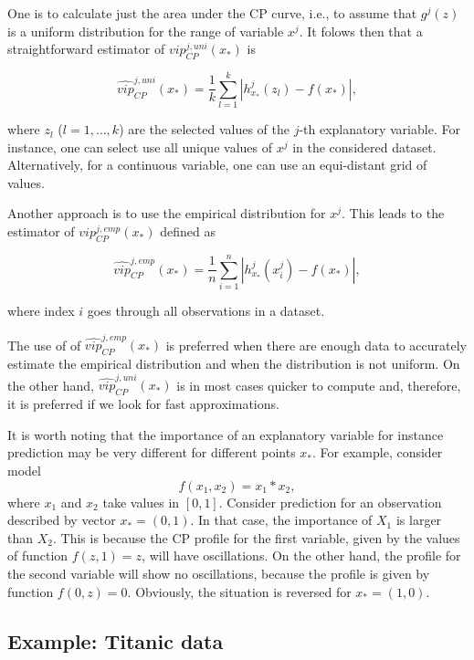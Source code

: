 \documentclass[12pt,]{krantz}
\theoremstyle{definition}
\theoremstyle{definition}
\theoremstyle{definition}
\theoremstyle{remark}
\begin{document}
One is to calculate just the area under the CP curve, i.e., to assume
that \(g^j(z)\) is a uniform distribution for the range of variable
\(x^j\). It folows then that a straightforward estimator of
\(vip_{CP}^{j,uni}(x_*)\) is

\begin{equation}
\widehat{vip}_{CP}^{j,uni}(x_*) = \frac 1k \sum_{l=1}^k |h^{j}_{x_*}(z_l) - f(x_*)|,
\label{eq:VIPCPuni}
\end{equation}

where \(z_l\) (\(l=1, \ldots, k\)) are the selected values of the
\(j\)-th explanatory variable. For instance, one can select use all
unique values of \(x^{j}\) in the considered dataset. Alternatively, for
a continuous variable, one can use an equi-distant grid of values.

Another approach is to use the empirical distribution for \(x^{j}\).
This leads to the estimator of \(vip_{CP}^{j,emp}(x_*)\) defined as

\begin{equation}
\widehat{vip}_{CP}^{j,emp}(x_*) = \frac 1n \sum_{i=1}^n |h^{j}_{x_*}(x^{j}_i) - f(x_*)|,
\label{eq:VIPCPemp}
\end{equation}

where index \(i\) goes through all observations in a dataset.

The use of of \(\widehat{vip}_{CP}^{j,emp}(x_*)\) is preferred when
there are enough data to accurately estimate the empirical distribution
and when the distribution is not uniform. On the other hand,
\(\widehat{vip}_{CP}^{j,uni}(x_*)\) is in most cases quicker to compute
and, therefore, it is preferred if we look for fast approximations.

It is worth noting that the importance of an explanatory variable for
instance prediction may be very different for different points \(x_*\).
For example, consider model \[
f(x_1, x_2) = x_1 * x_2,
\] where \(x_1\) and \(x_2\) take values in \([0,1]\). Consider
prediction for an observation described by vector \(x_* = (0,1)\). In
that case, the importance of \(X_1\) is larger than \(X_2\). This is
because the CP profile for the first variable, given by the values of
function \(f(z,1)=z\), will have oscillations. On the other hand, the
profile for the second variable will show no oscillations, because the
profile is given by function \(f(0,z)=0\). Obviously, the situation is
reversed for \(x_*=(1,0)\).

\hypertarget{CPOscExample}{%
\subsection{Example: Titanic data}\label{CPOscExample}}
\end{document}
